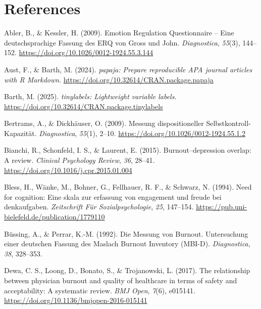 \documentclass[
  english,
  man]{apa6}
\newlength{\cslhangindent}
\newenvironment{CSLReferences}[2] %
 {\begin{list}{}{%
  \setlength{\itemindent}{0pt}
  \setlength{\leftmargin}{0pt}
  \setlength{\parsep}{0pt}
  \ifodd #1
   \setlength{\leftmargin}{\cslhangindent}
   \setlength{\itemindent}{-1\cslhangindent}
  \fi
  \setlength{\itemsep}{#2\baselineskip}}}
 {\end{list}}
\begin{document}
\newpage

\section{References}\label{references}

\label{refs}
\begin{CSLReferences}{1}{0}
Abler, B., \& Kessler, H. (2009). {Emotion Regulation Questionnaire -- Eine deutschsprachige Fassung des ERQ von Gross und John}. \emph{Diagnostica}, \emph{55}(3), 144--152. \url{https://doi.org/10.1026/0012-1924.55.3.144}

Aust, F., \& Barth, M. (2024). \emph{{papaja}: {Prepare} reproducible {APA} journal articles with {R Markdown}}. \url{https://doi.org/10.32614/CRAN.package.papaja}

Barth, M. (2025). \emph{{tinylabels}: Lightweight variable labels}. \url{https://doi.org/10.32614/CRAN.package.tinylabels}

Bertrams, A., \& Dickhäuser, O. (2009). {Messung dispositioneller Selbstkontroll-Kapazität}. \emph{Diagnostica}, \emph{55}(1), 2--10. \url{https://doi.org/10.1026/0012-1924.55.1.2}

Bianchi, R., Schonfeld, I. S., \& Laurent, E. (2015). Burnout--depression overlap: A review. \emph{Clinical Psychology Review}, \emph{36}, 28--41. \url{https://doi.org/10.1016/j.cpr.2015.01.004}

Bless, H., Wänke, M., Bohner, G., Fellhauer, R. F., \& Schwarz, N. (1994). Need for cognition: Eine skala zur erfassung von engagement und freude bei denkaufgaben. \emph{Zeitschrift Für Sozialpsychologie}, \emph{25}, 147--154. \url{https://pub.uni-bielefeld.de/publication/1779110}

Büssing, A., \& Perrar, K.-M. (1992). Die {Messung von Burnout. Untersuchung einer deutschen Fassung des Maslach Burnout Inventory (MBI-D)}. \emph{Diagnostica}, \emph{38}, 328--353.

Dewa, C. S., Loong, D., Bonato, S., \& Trojanowski, L. (2017). The relationship between physician burnout and quality of healthcare in terms of safety and acceptability: A systematic review. \emph{BMJ Open}, \emph{7}(6), e015141. \url{https://doi.org/10.1136/bmjopen-2016-015141}


\end{CSLReferences}
\end{document}
